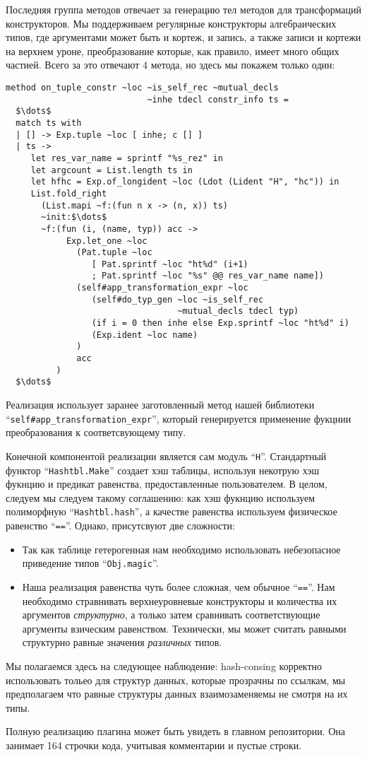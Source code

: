 Последняя группа методов отвечает за генерацию тел методов для трансформаций  конструкторов.
Мы поддерживаем регулярные конструкторы алгебраических типов, где аргументами может быть и кортеж, и запись, а также записи и кортежи на верхнем уроне, преобразование которые, как правило, имеет много общих частией. Всего за это отвечают 4 метода, но здесь мы покажем только один:

\begin{lstlisting}
method on_tuple_constr ~loc ~is_self_rec ~mutual_decls 
                            ~inhe tdecl constr_info ts =
  $\dots$ 
  match ts with
  | [] -> Exp.tuple ~loc [ inhe; c [] ]
  | ts ->
     let res_var_name = sprintf "%s_rez" in
     let argcount = List.length ts in
     let hfhc = Exp.of_longident ~loc (Ldot (Lident "H", "hc")) in
     List.fold_right
       (List.mapi ~f:(fun n x -> (n, x)) ts)
       ~init:$\dots$
       ~f:(fun (i, (name, typ)) acc ->
            Exp.let_one ~loc
              (Pat.tuple ~loc 
                 [ Pat.sprintf ~loc "ht%d" (i+1)
                 ; Pat.sprintf ~loc "%s" @@ res_var_name name])
              (self#app_transformation_expr ~loc
                 (self#do_typ_gen ~loc ~is_self_rec 
                                  ~mutual_decls tdecl typ)
                 (if i = 0 then inhe else Exp.sprintf ~loc "ht%d" i)
                 (Exp.ident ~loc name)
              )
              acc
          )
  $\dots$
\end{lstlisting}

Реализация использует заранее заготовленный метод нашей библиотеки
``\lstinline{self#app_transformation_expr}'', который генерируется применение фукцнии преобразования к соответсвующему типу.

Конечной компонентой реализации является сам  модуль ``\lstinline{H}''. Стандартный функтор ``\lstinline{Hashtbl.Make}'' создает хэш таблицы, используя некотрую хэш фукнцию и предикат равенства, предоставленные пользователем. В целом, следуем мы следуем такому соглашению: как хэш фукнцию используем полиморфную ``\lstinline{Hashtbl.hash}'', а качестве равенства используем физическое равенство ``\lstinline{==}''. Однако, присутсвуют две сложности:

\begin{itemize}
\item Так как таблице гетерогенная нам необходимо использовать небезопасное приведение типов ``\lstinline{Obj.magic}''.
\item Наша реализация равенства чуть более сложная, чем обычное ``\lstinline{==}''. Нам необходимо стравнивать верхнеуровневые конструкторы и количества их аргументов  \emph{структурно}, а только затем сравнивать соответствующие аргументы взическим равенством. Технически, мы может считать равными структурно равные значения   \emph{различных} типов.
\end{itemize}

Мы полагаемся здесь на следующее наблюдение: hash-consing корректно использовать тольео для структур данных, которые прозрачны по ссылкам, мы предполагаем что равные структуры данных взаимозаменяемы не смотря на их типы. 

Полную реализацию плагина может быть увидеть в главном репозитории. Она занимает 164 строчки кода, учитывая комментарии и пустые строки.
